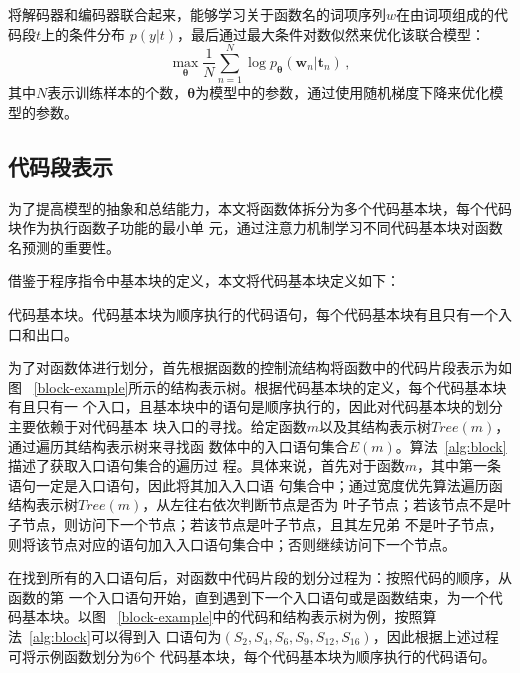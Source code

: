 将解码器和编码器联合起来，能够学习关于函数名的词项序列$w$在由词项组成的代码段$t$上的条件分布
$p(y|t)$，最后通过最大条件对数似然来优化该联合模型：
\begin{equation}
\max \limits_{\bm\theta} \frac{1}{N}\sum_{n=1}^{N} \log p_{\bm\theta}(\bm w_n | 
\bm t_n) \,,
\label{eq:loss}
\end{equation}
其中$N$表示训练样本的个数，$\bm\theta$为模型中的参数，通过使用随机梯度下降来优化模型的参数。

\subsection{代码段表示}
为了提高模型的抽象和总结能力，本文将函数体拆分为多个代码基本块，每个代码块作为执行函数子功能的最小单
元，通过注意力机制学习不同代码基本块对函数名预测的重要性。

借鉴于程序指令中基本块的定义，本文将代码基本块定义如下：
\begin{Definition}
    代码基本块。代码基本块为顺序执行的代码语句，每个代码基本块有且只有一个入口和出口。
\end{Definition}

为了对函数体进行划分，首先根据函数的控制流结构将函数中的代码片段表示为如图
~\ref{block-example}所示的结构表示树。根据代码基本块的定义，每个代码基本块有且只有一
个入口，且基本块中的语句是顺序执行的，因此对代码基本块的划分主要依赖于对代码基本
块入口的寻找。给定函数$m$以及其结构表示树$Tree(m)$，通过遍历其结构表示树来寻找函
数体中的入口语句集合$E(m)$。算法~\ref{alg:block}描述了获取入口语句集合的遍历过
程。具体来说，首先对于函数$m$，其中第一条语句一定是入口语句，因此将其加入入口语
句集合中；通过宽度优先算法遍历函结构表示树$Tree(m)$，从左往右依次判断节点是否为
叶子节点；若该节点不是叶子节点，则访问下一个节点；若该节点是叶子节点，且其左兄弟
不是叶子节点，则将该节点对应的语句加入入口语句集合中；否则继续访问下一个节点。

在找到所有的入口语句后，对函数中代码片段的划分过程为：按照代码的顺序，从函数的第
一个入口语句开始，直到遇到下一个入口语句或是函数结束，为一个代码基本块。以图
~\ref{block-example}中的代码和结构表示树为例，按照算法~\ref{alg:block}可以得到入
口语句为$(S_2,S_4,S_6,S_9,S_{12},S_{16})$，因此根据上述过程可将示例函数划分为6个
代码基本块，每个代码基本块为顺序执行的代码语句。

